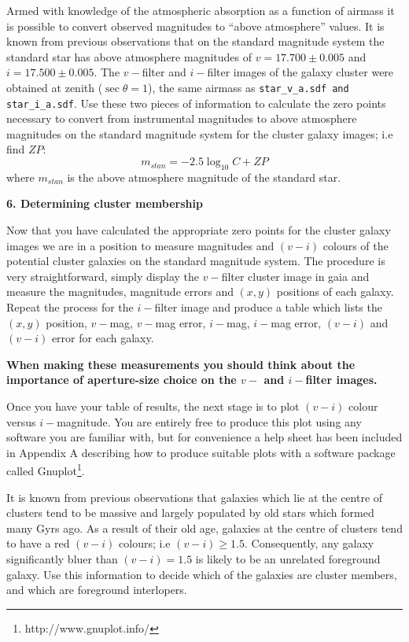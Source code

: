 Armed with knowledge of the atmospheric absorption as a function of airmass it is possible to convert observed magnitudes to ``above atmosphere'' values. It is known from previous observations that on the standard magnitude system the standard star has above atmosphere magnitudes of $v=17.700 \pm 0.005$ and $i=17.500\pm 0.005$. The $v-$filter and $i-$filter images of the galaxy cluster were obtained at zenith ($\sec \theta=1$), the same airmass as \verb,star_v_a.sdf and star_i_a.sdf,. Use these two pieces of information to calculate the zero points necessary to convert from instrumental magnitudes to above atmosphere magnitudes on the standard magnitude system for the cluster galaxy images; i.e find $ZP$:
\[
m_{stan} = -2.5\log_{10} C  + ZP 
\]
where $m_{stan}$ is the above atmosphere magnitude of the standard star.

{\large{\bf 6. Determining cluster membership}}

Now that you have calculated the appropriate zero points for the cluster galaxy images we are in a position to measure magnitudes and $(v-i)$ colours of the potential cluster galaxies on the standard magnitude system. The procedure is very straightforward, simply display the $v-$filter cluster image in {\sc gaia} and measure the magnitudes, magnitude errors and $(x,y)$ positions of each galaxy. Repeat the process for the $i-$filter image and produce a table which lists the $(x,y)$ position, $v-$mag, $v-$mag error, $i-$mag, $i-$mag error, $(v-i)$ and $(v-i)$ error for each galaxy. 

{\bf When making these measurements you should think about the importance of aperture-size choice on the $v-$ and $i-$filter images.}

Once you have your table of results, the next stage is to plot $(v-i)$ colour versus $i-$magnitude. You are entirely free to produce this plot using any software you are familiar with, but for convenience a help sheet has been included in Appendix A describing how to produce suitable plots with a software package called Gnuplot\footnote{http://www.gnuplot.info/}.

It is known from previous observations that galaxies which lie at the centre of clusters tend to be massive and largely populated by old stars which formed many Gyrs ago. As a result of their old age, galaxies at the centre of clusters tend to have a red $(v-i)$ colours; i.e $(v-i)\geq1.5$. Consequently, any galaxy significantly bluer than $(v-i)=1.5$ is likely to be an unrelated foreground galaxy. Use this information to decide which of the galaxies are cluster members, and which are foreground interlopers.

